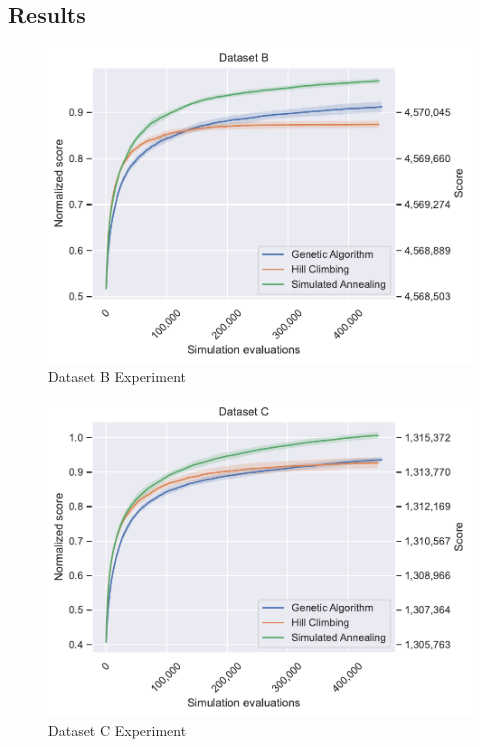 \subsection*{Results}

\begin{figure}
    \centering
    \includegraphics[width=\linewidth]{img/experiments/b_Genetic Algorithm_Hill Climbing_Simulated Annealing.pdf}
    \caption[Dataset B Experiment]{
        Dataset B Experiment
    }
    \label{fig:dataset_b_experiment}
\end{figure}

\begin{figure}
    \centering
    \includegraphics[width=\linewidth]{img/experiments/c_Genetic Algorithm_Hill Climbing_Simulated Annealing.pdf}
    \caption[Dataset C Experiment]{
        Dataset C Experiment
    }
    \label{fig:dataset_c_experiment}
\end{figure}

